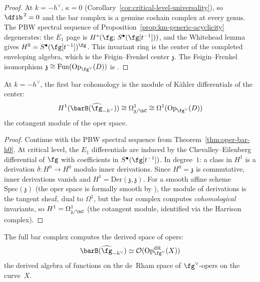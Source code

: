 \begin{proof}
At $k = -h^\vee$, $\kappa = 0$
(Corollary~\ref{cor:critical-level-universality}), so $\dfib^{\,2} = 0$
and the bar complex is a genuine cochain complex at every genus.  The PBW spectral
sequence of Proposition~\ref{prop:km-generic-acyclicity} degenerates:
the $E_1$ page is $H^*(\fg;\, S^\bullet(\fg[t^{-1}]))$, and the
Whitehead lemma gives $H^0 = S^\bullet(\fg[t^{-1}])^\fg$.
This invariant ring is the center of the completed enveloping algebra,
which is the Feigin--Frenkel center $\mathfrak{z}$.  The
Feigin--Frenkel isomorphism
$\mathfrak{z} \cong \mathrm{Fun}(\mathrm{Op}_{\fg^\vee}(D))$ is
\ClaimStatusProvedElsewhere{} \cite{Feigin-Frenkel, FG06}.
\end{proof}

\begin{proposition}\label{prop:oper-bar-h1}
At $k = -h^\vee$, the first bar cohomology is the module of
K\"ahler differentials of the center:
\begin{equation}\label{eq:bar-oper-h1}
H^1(\barB(\widehat{\fg}_{-h^\vee}))
\cong \Omega^1_{\mathfrak{z}/\bC}
\cong \Omega^1(\mathrm{Op}_{\fg^\vee}(D))
\end{equation}
the cotangent module of the oper space.
\end{proposition}

\begin{proof}
Continue with the PBW spectral sequence from
Theorem~\ref{thm:oper-bar-h0}.  At critical level, the $E_1$
differentials are induced by the Chevalley--Eilenberg differential
of $\fg$ with coefficients in $S^\bullet(\fg[t^{-1}])$.
In degree~$1$: a class in $H^1$ is a derivation
$\delta\colon H^0 \to H^0$ modulo inner derivations.  Since
$H^0 = \mathfrak{z}$ is commutative, inner derivations vanish and
$H^1 = \mathrm{Der}(\mathfrak{z}, \mathfrak{z})$.  For a smooth
affine scheme $\mathrm{Spec}(\mathfrak{z})$ (the oper space is
formally smooth by \cite{FG06}), the
module of derivations is the tangent sheaf, dual to $\Omega^1$,
but the bar complex computes \emph{cohomological} invariants, so
$H^1 = \Omega^1_{\mathfrak{z}/\bC}$ (the cotangent module,
identified via the Harrison complex).
\end{proof}

\begin{theorem}\label{thm:oper-bar}
The full bar complex computes the derived space of opers:
\begin{equation}\label{eq:bar-derived-oper}
\barB(\widehat{\fg}_{-h^\vee})
\simeq \mathcal{O}(\mathrm{Op}_{\fg^\vee}^{\mathrm{dR}}(X))
\end{equation}
the derived algebra of functions on the de~Rham space of
$\fg^\vee$-opers on the curve~$X$.
\end{theorem}

